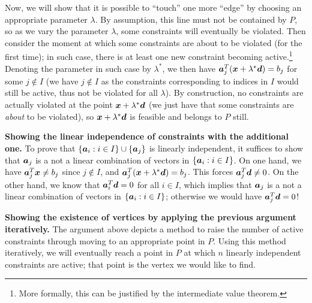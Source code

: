 \begin{enumerate}
\begin{pf}
Now, we will show that it is possible to ``touch'' one more ``edge'' by
choosing an appropriate parameter \(\lambda\). By assumption, this line must
not be contained by \(P\), so as we vary the parameter \(\lambda\), some
constraints will eventually be violated. Then consider the moment at which some
constraints are about to be violated (for the first time); in such case, there
is at least one new constraint becoming active.\footnote{More formally, this
can be justified by the intermediate value theorem.} Denoting the parameter in
such case by \(\lambda^*\), we then have
\(\bm{a}_j^{T}(\bm{x}+\lambda^{*}\bm{d})=b_j\) for some \(j\notin I\) (we
have \(j\notin I\) as the constraints corresponding to indices in \(I\) would
still be active, thus not be violated for all \(\lambda\)). By construction, no
constraints are actually violated at the point \(\bm{x}+\lambda^{*}\bm{d}\)
(we just have that some constraints are \emph{about} to be violated), so
\(\bm{x}+\lambda^{*}\bm{d}\) is feasible and belongs to \(P\) still.

\textbf{Showing the linear independence of constraints with the additional one.}
To prove that \(\{\bm{a}_i:i\in I\}\cup\{\bm{a}_j\}\) is linearly
independent, it suffices to show that \(\bm{a}_j\) is a not a linear
combination of vectors in \(\{\bm{a}_i:i\in I\}\). On one hand, we have
\(\bm{a}_j^{T}\bm{x}\ne b_j\) since \(j\notin I\), and
\(\bm{a}_j^{T}(\bm{x}+\lambda^*\bm{d})=b_j\). This forces
\(\bm{a}_j^{T}\bm{d}\ne 0\). On the other hand, we know that
\(\bm{a}_i^{T}\bm{d}=0\) for all \(i\in I\), which implies that
\(\bm{a}_j\) is a not a linear
combination of vectors in \(\{\bm{a}_i:i\in I\}\); otherwise we would have
\(\bm{a}_j^{T}\bm{d}=0\)!

\textbf{Showing the existence of vertices by applying the previous argument iteratively.}
The argument above depicts a method to raise the number of active constraints
through moving to an appropriate point in \(P\). Using this method iteratively,
we will eventually reach a point in \(P\) at which \(n\) linearly independent
constraints are active; that point is the vertex we would like to find.
\end{pf}


\end{enumerate}

